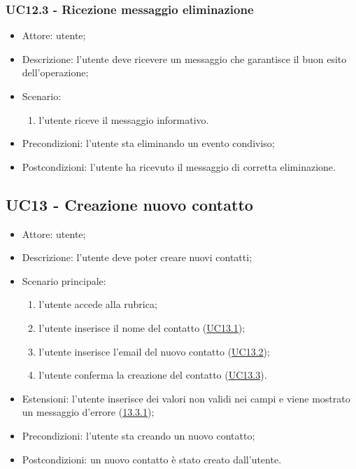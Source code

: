 \subsubsection{UC12.3 - Ricezione messaggio eliminazione} \label{sec: UC12.3}
\begin{itemize}
    \item Attore: utente;
    \item Descrizione: l'utente deve ricevere un messaggio che garantisce il buon esito dell'operazione;
    \item Scenario:
        \begin{enumerate}
        \item l'utente riceve il messaggio informativo.
        \end{enumerate}
    
    \item Precondizioni: l'utente sta eliminando un evento condiviso;
    \item Postcondizioni: l'utente ha ricevuto il messaggio di corretta eliminazione.
\end{itemize}




\subsection{UC13 - Creazione nuovo contatto}
\begin{itemize}
    \item Attore: utente;
    \item Descrizione: l'utente deve poter creare nuovi contatti;
    \item Scenario principale:
        \begin{enumerate}
        \item l'utente accede alla rubrica;
        \item l'utente inserisce il nome del contatto (\hyperref[sec: UC13.1]{UC13.1});
        \item l'utente inserisce l'email del nuovo contatto (\hyperref[sec: UC13.2]{UC13.2});
        \item l'utente conferma la creazione del contatto (\hyperref[sec: UC13.3]{UC13.3}).
        \end{enumerate}
    \item Estensioni: l'utente inserisce dei valori non validi nei campi e viene mostrato un messaggio d'errore (\hyperref[sec: UC13.3.1]{13.3.1});
    \item Precondizioni: l'utente sta creando un nuovo contatto;
    \item Postcondizioni: un nuovo contatto è stato creato dall'utente.
\end{itemize}


